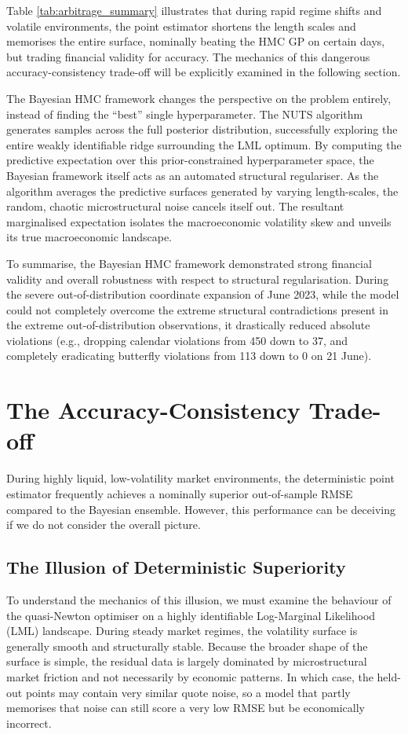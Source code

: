 \documentclass[12pt,oneside]{report}
\theoremstyle{definition}
\theoremstyle{remark}
\begin{document}
Table \ref{tab:arbitrage_summary} illustrates that during rapid regime shifts and volatile environments, the point estimator shortens the length scales and memorises the entire surface, nominally beating the HMC GP on certain days, but trading financial validity for accuracy. The mechanics of this dangerous accuracy-consistency trade-off will be explicitly examined in the following section.

The Bayesian HMC framework changes the perspective on the problem entirely, instead of finding the “best” single hyperparameter. The NUTS algorithm generates samples across the full posterior distribution, successfully exploring the entire weakly identifiable ridge surrounding the LML optimum. By computing the predictive expectation over this prior-constrained hyperparameter space, the Bayesian framework itself acts as an automated structural regulariser. As the algorithm averages the predictive surfaces generated by varying length-scales, the random, chaotic microstructural noise cancels itself out. The resultant marginalised expectation isolates the macroeconomic volatility skew and unveils its true macroeconomic landscape.

To summarise, the Bayesian HMC framework demonstrated strong financial validity and overall robustness with respect to structural regularisation. During the severe out-of-distribution coordinate expansion of June 2023, while the model could not completely overcome the extreme structural contradictions present in the extreme out-of-distribution observations, it drastically reduced absolute violations (e.g., dropping calendar violations from 450 down to 37, and completely eradicating butterfly violations from 113 down to 0 on 21 June).

\section{The Accuracy-Consistency Trade-off}
\label{sec:accuracy_consistency_tradeoff}
During highly liquid, low-volatility market environments, the deterministic point estimator frequently achieves a nominally superior out-of-sample RMSE compared to the Bayesian ensemble. However, this performance can be deceiving if we do not consider the overall picture.

\subsection{The Illusion of Deterministic Superiority}To understand the mechanics of this illusion, we must examine the behaviour of the quasi-Newton optimiser on a highly identifiable Log-Marginal Likelihood (LML) landscape. During steady market regimes, the volatility surface is generally smooth and structurally stable. Because the broader shape of the surface is simple, the residual data is largely dominated by microstructural market friction and not necessarily by economic patterns. In which case, the held-out points may contain very similar quote noise, so a model that partly memorises that noise can still score a very low RMSE but be economically incorrect.
\end{document}
